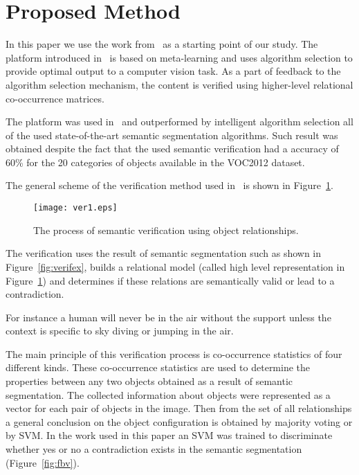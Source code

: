 \documentclass[conference]{IEEEtran}
\begin{document}
\section{Proposed Method}
\label{sec:met}
In this paper we use the work from~\cite{lukac:13d} as a starting point of our study. The platform introduced in~\cite{lukac:13d} is based on meta-learning and uses algorithm selection to provide optimal output to a computer vision task. As a part of feedback to the algorithm selection mechanism, the content is verified using higher-level relational co-occurrence matrices.


The platform was used in~\cite{lukac:16} and outperformed by intelligent algorithm selection all of the used state-of-the-art semantic segmentation algorithms. Such result was obtained despite the fact that the used semantic verification had a accuracy of 60\% for the 20 categories of objects available in the VOC2012 dataset. 

The general scheme of the verification method used in~\cite{lukac:16}  is shown in Figure~\ref{fig:ver1}. 

\begin{figure}[bht]
	\centering
	\texttt{[image: ver1.eps]}
	\caption{\label{fig:ver1} The process of semantic verification using object relationships.}
\end{figure}

The verification uses the result of semantic segmentation such as shown in Figure~\ref{fig:verifex}, builds a relational model (called high level representation in Figure~\ref{fig:ver1}) and determines if these relations are semantically valid or lead to a contradiction. 

For instance a human will never be in the air without the support unless the context is specific to sky diving or jumping in the air. 

The main principle of this verification process is co-occurrence statistics of four different kinds. These co-occurrence statistics are used to determine the properties between any two objects obtained as a result of semantic segmentation. The collected information about objects were represented as a vector for each pair of objects in the image. Then from the set of all relationships a general conclusion on the object configuration is obtained by majority voting or by SVM. In the work used in this paper an SVM was trained to discriminate whether yes or no a contradiction exists in the semantic segmentation (Figure~\ref{fig:fbv}). %
\end{document}
